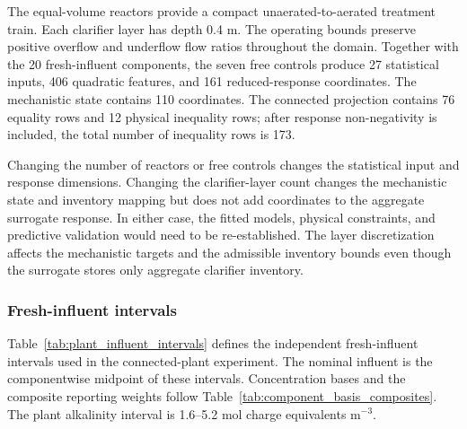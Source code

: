 The equal-volume reactors provide a compact unaerated-to-aerated treatment train. Each clarifier layer has depth 0.4 m. The operating bounds preserve positive overflow and underflow flow ratios throughout the domain. Together with the 20 fresh-influent components, the seven free controls produce 27 statistical inputs, 406 quadratic features, and 161 reduced-response coordinates. The mechanistic state contains 110 coordinates. The connected projection contains 76 equality rows and 12 physical inequality rows; after response non-negativity is included, the total number of inequality rows is 173.

Changing the number of reactors or free controls changes the statistical input and response dimensions. Changing the clarifier-layer count changes the mechanistic state and inventory mapping but does not add coordinates to the aggregate surrogate response. In either case, the fitted models, physical constraints, and predictive validation would need to be re-established. The layer discretization affects the mechanistic targets and the admissible inventory bounds even though the surrogate stores only aggregate clarifier inventory.

\subsubsection{Fresh-influent intervals}

Table~\ref{tab:plant_influent_intervals} defines the independent fresh-influent intervals used in the connected-plant experiment. The nominal influent is the componentwise midpoint of these intervals. Concentration bases and the composite reporting weights follow Table~\ref{tab:component_basis_composites}. The plant alkalinity interval is 1.6--5.2 mol charge equivalents m$^{-3}$.

